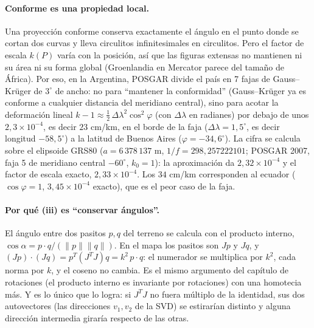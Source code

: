 \paragraph{Conforme es una propiedad local.} Una proyección conforme conserva exactamente
el ángulo en el punto donde se cortan dos curvas y lleva circulitos infinitesimales en
circulitos. Pero el factor de escala \(k(P)\) varía con la posición, así que las figuras
extensas no mantienen ni su área ni su forma global (Groenlandia en Mercator parece del
tamaño de África). Por eso, en la Argentina, POSGAR divide el país en 7 fajas de
Gauss--Krüger de \(3^\circ\) de ancho: no para \enquote{mantener la conformidad} (Gauss--Krüger
ya es conforme a cualquier distancia del meridiano central), sino para acotar la
deformación lineal \(k-1\approx\tfrac12\,\Delta\lambda^2\cos^2\varphi\) (con \(\Delta\lambda\)
en radianes) por debajo de unos \(2{,}3\times10^{-4}\), es decir \(23\) cm/km, en el borde de la
faja (\(\Delta\lambda=1{,}5^\circ\), es decir longitud \(-58{,}5^\circ\)) a la latitud de Buenos Aires
(\(\varphi=-34{,}6^\circ\)). La cifra se calcula sobre el elipsoide GRS80 (\(a=6\,378\,137\) m,
\(1/f=298{,}257222101\); POSGAR 2007, faja 5 de meridiano central \(-60^\circ\), \(k_0=1\)): la aproximación da \(2{,}32\times10^{-4}\) y el
factor de escala exacto, \(2{,}33\times10^{-4}\). Los \(34\) cm/km corresponden al
ecuador (\(\cos\varphi=1\), \(3{,}45\times10^{-4}\) exacto), que es el peor caso de la
faja.

\paragraph{Por qué (iii) es \enquote{conservar ángulos}.} El ángulo entre dos pasitos \(p,q\)
del terreno se calcula con el producto interno, \(\cos\alpha=p\cdot q/(\|p\|\|q\|)\). En el
mapa los pasitos son \(Jp\) y \(Jq\), y \((Jp)\cdot(Jq)=p^T(J^TJ)q=k^2\,p\cdot q\): el
numerador se multiplica por \(k^2\), cada norma por \(k\), y el coseno no cambia. Es el
mismo argumento del capítulo de rotaciones (el producto interno es invariante por rotaciones) con una
homotecia más. Y es lo único que lo logra: si \(J^TJ\) no fuera múltiplo de la identidad,
sus dos autovectores (las direcciones \(v_1,v_2\) de la SVD) se estirarían distinto y
alguna dirección intermedia giraría respecto de las otras.

